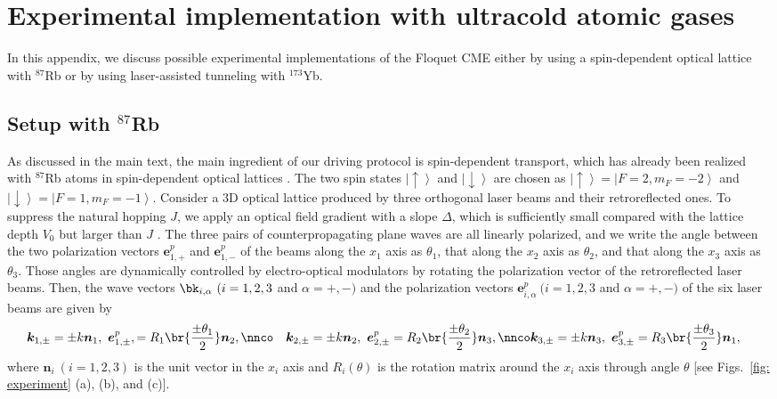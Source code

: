 \documentclass[
floatfix,
pra,
twocolumn,
reprint,
amsmath,amssymb,
aps,
footnote,
]{revtex4}
\begin{document}
\section{\label{sec: experiment}Experimental implementation with ultracold atomic gases}
In this appendix,
we discuss possible experimental implementations of the Floquet CME either by using a spin-dependent optical lattice with ${}^{87}$Rb or by using laser-assisted tunneling with ${}^{173}$Yb.

\subsection{Setup with ${}^{87}$Rb}
As discussed in the main text, the main ingredient of our driving protocol
is spin-dependent transport, which has already been realized with ${}^{87}$Rb atoms in spin-dependent optical lattices \cite{Mandel03a, Mandel03b}.
The two spin states $\left| \uparrow \right>$ and $\left| \downarrow \right>$ are chosen as $\left| \uparrow \right> = \left| F=2, m_F = -2 \right>$ and $\left| \downarrow \right> = \left| F = 1, m_F = -1 \right>$.
Consider a 3D optical lattice produced by three orthogonal laser beams and their retroreflected ones.
To suppress the natural hopping $J$, we apply an optical  field gradient with a slope $\Delta$, which is sufficiently small compared with the lattice depth $V_0$ but larger than $J$ \cite{JakschD03, AidelsburgerM14}.
The three pairs of counterpropagating plane waves are all linearly polarized,
and we write the angle between the two polarization vectors $\bm{e}^p_{1, +}$ and $\bm{e}^p_{1,-}$ of the beams along the $x_1$ axis as $\theta_1$, that along the $x_2$ axis as $\theta_2$, and that along the $x_3$ axis as $\theta_3$.
Those angles are dynamically controlled by electro-optical modulators by rotating the polarization vector of the retroreflected laser beams.
Then, the wave vectors $\bk_{i,\alpha} \ (i = 1,2,3$ and $\alpha = +, -)$ and the polarization vectors $\bm{e}^p_{i,\alpha} \ (i = 1,2,3$ and $\alpha = +, -)$ of the six laser beams are given by
\begin{align}
	& \bm{k}_{1, \pm} = \pm k \bm{n}_1,
	\ \bm{e}^p_{1, \pm}, = R_1\br{{\pm \theta_1 \over 2}} \bm{n}_2,
	\nnco
	& \bm{k}_{2, \pm} = \pm k \bm{n}_2,
	\ \bm{e}^p_{2, \pm} = R_2\br{{\pm \theta_2 \over 2}} \bm{n}_3,
	\nnco
	& \bm{k}_{3, \pm} = \pm k \bm{n}_3,
	\ \bm{e}^p_{3, \pm} = R_3\br{{\pm \theta_3 \over 2}} \bm{n}_1
	,
\end{align}
where $\bm{n}_i \ (i = 1,2,3)$ is the unit vector in the $x_i$ axis and $R_i(\theta)$ is the rotation matrix around the $x_i$ axis through angle $\theta$ [see Figs.~\ref{fig: experiment} (a), (b), and (c)].
\end{document}
